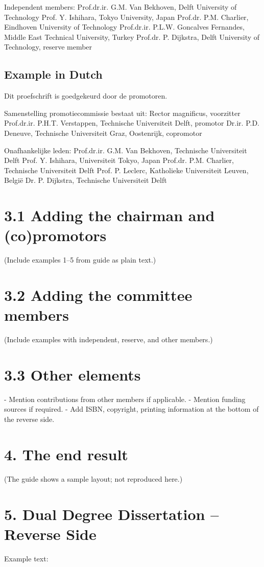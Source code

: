 Independent members:  
Prof.dr.ir. G.M. Van Bekhoven, Delft University of Technology  
Prof. Y. Ishihara, Tokyo University, Japan  
Prof.dr. P.M. Charlier, Eindhoven University of Technology  
Prof.dr.ir. P.L.W. Goncalves Fernandes, Middle East Technical University, Turkey  
Prof.dr. P. Dijkstra, Delft University of Technology, reserve member  

\subsection*{Example in Dutch}
Dit proefschrift is goedgekeurd door de promotoren.  

Samenstelling promotiecommissie bestaat uit:  
Rector magnificus, voorzitter  
Prof.dr.ir. P.H.T. Verstappen, Technische Universiteit Delft, promotor  
Dr.ir. P.D. Deneuve, Technische Universiteit Graz, Oostenrijk, copromotor  

Onafhankelijke leden:  
Prof.dr.ir. G.M. Van Bekhoven, Technische Universiteit Delft  
Prof. Y. Ishihara, Universiteit Tokyo, Japan  
Prof.dr. P.M. Charlier, Technische Universiteit Delft  
Prof. P. Leclerc, Katholieke Universiteit Leuven, België  
Dr. P. Dijkstra, Technische Universiteit Delft  

\section*{3.1 Adding the chairman and (co)promotors}
(Include examples 1–5 from guide as plain text.)

\section*{3.2 Adding the committee members}
(Include examples with independent, reserve, and other members.)

\section*{3.3 Other elements}
- Mention contributions from other members if applicable.  
- Mention funding sources if required.  
- Add ISBN, copyright, printing information at the bottom of the reverse side.  

\section*{4. The end result}
(The guide shows a sample layout; not reproduced here.)  

\section*{5. Dual Degree Dissertation – Reverse Side}
Example text:  

